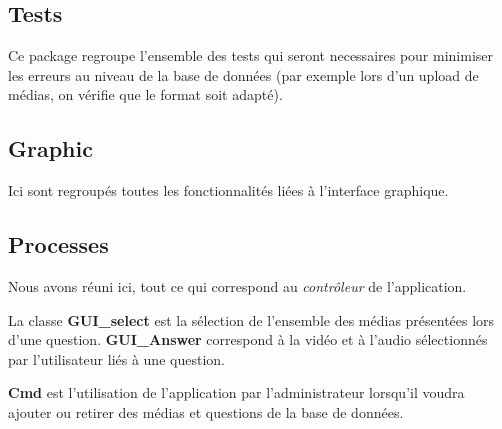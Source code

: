 \subsection{Tests}

Ce package regroupe l'ensemble des tests qui seront necessaires pour minimiser les erreurs au niveau de la base de données (par exemple lors d'un upload de médias, on vérifie que le format soit adapté).

\subsection{Graphic}

Ici sont regroupés toutes les fonctionnalités liées à l'interface graphique.

\subsection{Processes}

Nous avons réuni ici, tout ce qui correspond au \textit{contrôleur} de l'application.

La classe \textbf{GUI\_select} est la sélection de l'ensemble des médias présentées lors d'une question.
\textbf{GUI\_Answer} correspond à la vidéo et à l'audio sélectionnés par l'utilisateur liés à une question.

\textbf{Cmd} est l'utilisation de l'application par l'administrateur lorsqu'il voudra ajouter ou retirer des médias et questions de la base de données.
